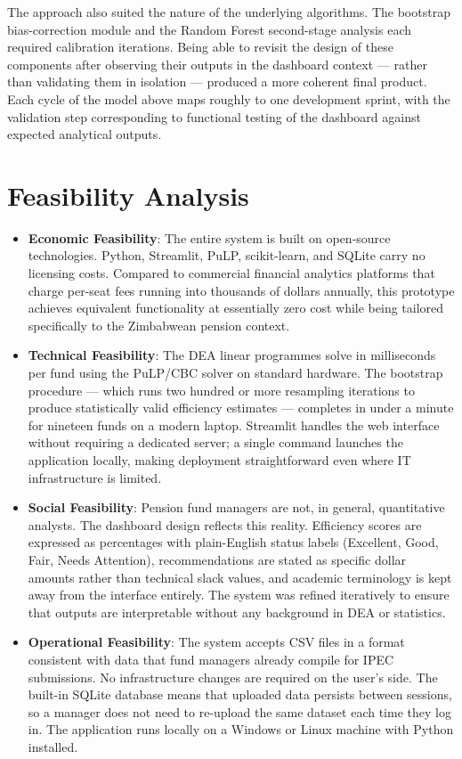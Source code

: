 \documentclass[12pt,a4paper]{report}
\begin{document}
The approach also suited the nature of the underlying algorithms. The bootstrap
bias-correction module and the Random Forest second-stage analysis each required
calibration iterations. Being able to revisit the design of these components after
observing their outputs in the dashboard context --- rather than validating them in
isolation --- produced a more coherent final product. Each cycle of the model above maps
roughly to one development sprint, with the validation step corresponding to functional
testing of the dashboard against expected analytical outputs.

\section{Feasibility Analysis}

\begin{itemize}
  \item \textbf{Economic Feasibility}: The entire system is built on open-source
  technologies. Python, Streamlit, PuLP, scikit-learn, and SQLite carry no licensing
  costs. Compared to commercial financial analytics platforms that charge per-seat fees
  running into thousands of dollars annually, this prototype achieves equivalent
  functionality at essentially zero cost while being tailored specifically to the
  Zimbabwean pension context.

  \item \textbf{Technical Feasibility}: The DEA linear programmes solve in milliseconds
  per fund using the PuLP/CBC solver on standard hardware. The bootstrap procedure ---
  which runs two hundred or more resampling iterations to produce statistically valid
  efficiency estimates --- completes in under a minute for nineteen funds on a modern
  laptop. Streamlit handles the web interface without requiring a dedicated server; a
  single command launches the application locally, making deployment straightforward even
  where IT infrastructure is limited.

  \item \textbf{Social Feasibility}: Pension fund managers are not, in general,
  quantitative analysts. The dashboard design reflects this reality. Efficiency scores are
  expressed as percentages with plain-English status labels (Excellent, Good, Fair, Needs
  Attention), recommendations are stated as specific dollar amounts rather than technical
  slack values, and academic terminology is kept away from the interface entirely. The
  system was refined iteratively to ensure that outputs are interpretable without any
  background in DEA or statistics.

  \item \textbf{Operational Feasibility}: The system accepts CSV files in a format
  consistent with data that fund managers already compile for IPEC submissions. No
  infrastructure changes are required on the user's side. The built-in SQLite database
  means that uploaded data persists between sessions, so a manager does not need to
  re-upload the same dataset each time they log in. The application runs locally on a
  Windows or Linux machine with Python installed.
\end{itemize}
\end{document}
